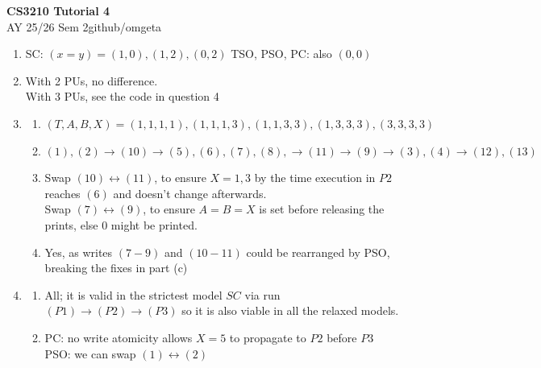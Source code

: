 \documentclass[12pt, a4paper]{article}
\newcommand{\mytitle}{CS3210 Tutorial 4}
\newcommand{\myauthor}{github/omgeta}
\newcommand{\mydate}{AY 25/26 Sem 2}
\begin{document}
\raggedright
\normalsize
\begin{center}
{\normalsize{\textbf{\mytitle}}} \\
{\footnotesize{\mydate\hspace{2pt}\textemdash\hspace{2pt}\myauthor}}
\end{center}
\begin{enumerate}[Q\arabic*.]
  \item SC: $(x=y) = (1,0), (1,2), (0,2)$
    TSO, PSO, PC: also $(0,0)$

  \item With 2 PUs, no difference.\\
    With 3 PUs, see the code in question 4

  \item 
    \begin{enumerate}
      \item $(T,A,B,X) = (1, 1, 1, 1), (1, 1, 1, 3), (1, 1, 3, 3), (1, 3, 3, 3), (3, 3, 3, 3)$

      \item $(1),(2) \rightarrow (10) \rightarrow (5), (6), (7), (8), \rightarrow (11) \rightarrow (9) \rightarrow (3), (4) \rightarrow (12), (13)$ 

      \item Swap $(10) \leftrightarrow (11)$, to ensure $X=1,3$ by the time execution in $P2$ reaches $(6)$ and doesn't change afterwards.\\ 
        Swap $(7) \leftrightarrow (9)$, to ensure $A = B =X$ is set before releasing the prints, else $0$ might be printed.

      \item Yes, as writes $(7-9)$ and $(10-11)$ could be rearranged by PSO, breaking the fixes in part (c)
    \end{enumerate}

  \item 
    \begin{enumerate}
      \item All; it is valid in the strictest model $SC$ via run $(P1)\rightarrow(P2)\rightarrow(P3)$ so it is also viable in all the relaxed models. 

      \item PC: no write atomicity allows $X=5$ to propagate to $P2$ before $P3$\\ 
        PSO: we can swap $(1)\leftrightarrow(2)$
    \end{enumerate}


\end{enumerate}
\end{document}

